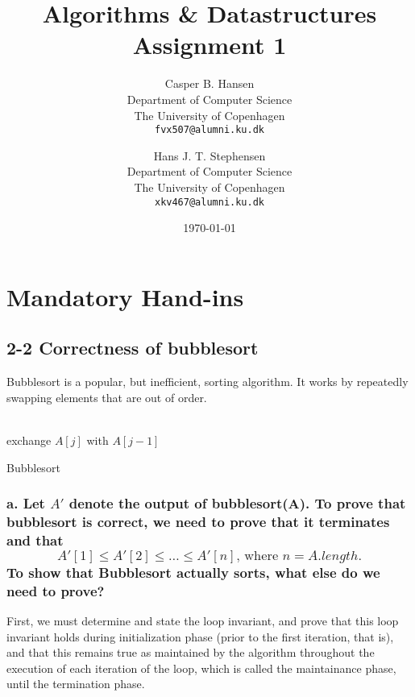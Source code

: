 \documentclass[11pt,english]{article}
\title
{
	\vspace{1in}
	Algorithms \& Datastructures\\
	\huge Assignment 1
}
\author
{
	Casper B. Hansen\\
	\small Department of Computer Science\\
	\small The University of Copenhagen\\
	\texttt{fvx507@alumni.ku.dk}
	\and
	Hans J. T. Stephensen\\
	\small Department of Computer Science\\
	\small The University of Copenhagen\\
	\texttt{xkv467@alumni.ku.dk}
}
\date{\today}
\begin{document}
\clearpage
\maketitle
\thispagestyle{empty}


\newpage
\pagestyle{fancy}

\section*{Mandatory Hand-ins}

\subsection*{2-2 Correctness of bubblesort}
Bubblesort is a popular, but inefficient, sorting algorithm. It works by
repeatedly swapping elements that are out of order.
\\\\
\begin{algorithm}[H]
	
	\BlankLine
	{
		{
			{
				exchange $A[j]$ with $A[j-1]$
			}
		}
	}
	\caption{Bubblesort}
\end{algorithm}

\subsubsection*{a. \mdseries Let $A'$ denote the output of bubblesort(A). To
prove that bubblesort is correct, we need to prove that it terminates and that
\[A'[1] \leq A'[2] \leq \dots \leq A'[n]\text{, where $n = A.length$.}\] To
show that Bubblesort actually sorts, what else do we need to prove?}
First, we must determine and state the loop invariant, and prove that this
loop invariant holds during initialization phase (prior to the first iteration,
that is), and that this remains true as maintained by the algorithm throughout
the execution of each iteration of the loop, which is called the maintainance
phase, until the termination phase.
\end{document}
